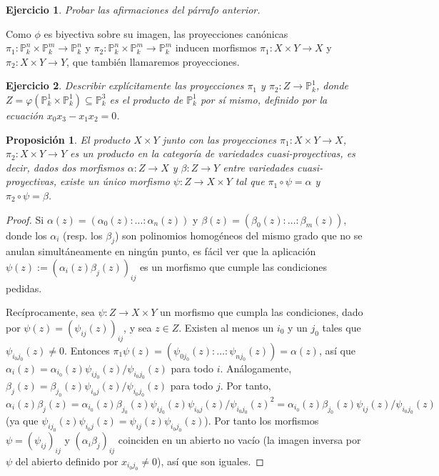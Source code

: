 \documentclass[a4paper,10pt]{book}
\newtheorem{prop}[thm]{Proposición}
\newtheorem{ejercicio}{Ejercicio}[chapter]
\newcommand{\PP}{\mathbb P}
\newcommand{\Pnk}{\PP^n_k}
\newcommand{\Pmk}{\PP^m_k}
\begin{document}
\begin{ejercicio}
 Probar las afirmaciones del párrafo anterior.
\end{ejercicio}

Como $\phi$ es biyectiva sobre su imagen, las proyecciones canónicas $\pi_1:\Pnk\times\Pmk\to \Pnk$ y $\pi_2:\Pnk\times\Pmk\to\Pmk$ inducen morfismos $\pi_1:X\times Y\to X$ y $\pi_2:X\times Y\to Y$, que también llamaremos proyecciones. 
 
\begin{ejercicio}
 Describir explícitamente las proyecciones $\pi_1$ y $\pi_2:Z\to\PP^1_k$, donde $Z=\varphi(\PP^1_k\times\PP^1_k)\subseteq\PP^3_k$ es el producto de $\PP^1_k$ por sí mismo, definido por la ecuación $x_0x_3-x_1x_2=0$. 
\end{ejercicio}


\begin{prop}
 El producto $X\times Y$ junto con las proyecciones $\pi_1:X\times Y\to X$, $\pi_2:X\times Y\to Y$ es un producto en la categoría de variedades cuasi-proyectivas, es decir, dados dos morfismos $\alpha:Z\to X$ y $\beta:Z\to Y$ entre variedades cuasi-proyectivas, existe un único morfismo $\psi:Z\to X\times Y$ tal que $\pi_1\circ\psi=\alpha$ y $\pi_2\circ\psi=\beta$.
\end{prop}

\begin{proof}
 Si $\alpha(z)=(\alpha_0(z):\ldots:\alpha_n(z))$ y $\beta(z)=(\beta_0(z):\ldots:\beta_m(z))$, donde los $\alpha_i$ (resp. los $\beta_j$) son polinomios homogéneos del mismo grado que no se anulan simultáneamente en ningún punto, es fácil ver que la aplicación $\psi(z):=(\alpha_i(z)\beta_j(z))_{ij}$ es un morfismo que cumple las condiciones pedidas. 

 Recíprocamente, sea $\psi:Z\to X\times Y$ un morfismo que cumpla las condiciones, dado por $\psi(z)=(\psi_{ij}(z))_{ij}$, y sea $z\in Z$. Existen al menos un $i_0$ y un $j_0$ tales que $\psi_{i_0j_0}(z)\neq 0$. Entonces $\pi_1\psi(z)=(\psi_{0j_0}(z):\ldots:\psi_{nj_0}(z))=\alpha(z)$, así que $\alpha_i(z)=\alpha_{i_0}(z)\psi_{ij_0}(z)/\psi_{i_0j_0}(z)$ para todo $i$. Análogamente, $\beta_j(z)=\beta_{j_0}(z)\psi_{i_0j}(z)/\psi_{i_0j_0}(z)$ para todo $j$. Por tanto, $$\alpha_i(z)\beta_j(z)=\alpha_{i_0}(z)\beta_{j_0}(z)\psi_{ij_0}(z)\psi_{i_0j}(z)/\psi_{i_0j_0}(z)^2=\alpha_{i_0}(z)\beta_{j_0}(z)\psi_{ij}(z)/\psi_{i_0j_0}(z)$$ (ya que $\psi_{ij_0}(z)\psi_{i_0j}(z)=\psi_{ij}(z)\psi_{i_0j_0}(z)$). Por tanto los morfismos $\psi=(\psi_{ij})_{ij}$ y $(\alpha_i\beta_j)_{ij}$ coinciden en un abierto no vacío (la imagen inversa por $\psi$ del abierto definido por $x_{i_0j_0}\neq 0$), así que son iguales.
\end{proof}
\end{document}
